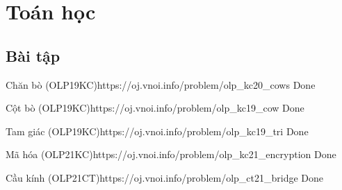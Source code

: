 \chapter{Toán học}

\minitoc

\section{Bài tập}
\begin{baitap}{Chăn bò (OLP19KC)}{https://oj.vnoi.info/problem/olp\_kc20\_cows}
    Done
\end{baitap}

\begin{baitap}{Cột bò (OLP19KC)}{https://oj.vnoi.info/problem/olp\_kc19\_cow}
    Done
\end{baitap}

\begin{baitap}{Tam giác (OLP19KC)}{https://oj.vnoi.info/problem/olp\_kc19\_tri}
    Done
\end{baitap}

\begin{baitap}{Mã hóa (OLP21KC)}{https://oj.vnoi.info/problem/olp\_kc21\_encryption}
    Done
\end{baitap}

\begin{baitap}{Cầu kính (OLP21CT)}{https://oj.vnoi.info/problem/olp\_ct21\_bridge}
    Done
\end{baitap}

